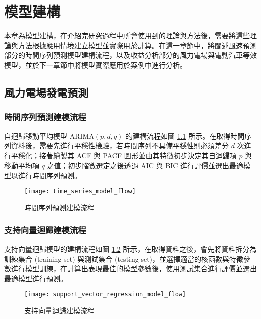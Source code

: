 
\chapter{模型建構}

本章為模型建構，在介紹完研究過程中所會使用到的理論與方法後，需要將這些理論與方法根據應用情境建立模型並實際用於計算。在這一章節中，將闡述風速預測部分的時間序列預測模型建構流程，以及收益分析部分的風力電場與電動汽車等效模型，並於下一章節中將模型實際應用於案例中進行分析。

\section{風力電場發電預測}

\subsection{時間序列預測建模流程}

自迴歸移動平均模型 $\text{ARIMA}(p, d, q)$ 的建構流程如圖 \ref{figure: Time Series Model Flow} 所示。在取得時間序列資料後，需要先進行平穩性檢驗，若時間序列不具備平穩性則必須差分 $d$ 次進行平穩化；接著繪製其 ACF 與 PACF 圖形並由其特徵初步決定其自迴歸項 $p$ 與移動平均項 $q$ 之值；初步階數選定之後透過 AIC 與 BIC 進行評價並選出最適模型以進行時間序列預測。

\begin{figure}[htbp]
  \centering
  \texttt{[image: time\_series\_model\_flow]}
  \caption{時間序列預測建模流程}
  \label{figure: Time Series Model Flow}
\end{figure}

\subsection{支持向量迴歸建模流程}

支持向量迴歸模型的建構流程如圖 \ref{figure: Support Vector Regression Flow} 所示，在取得資料之後，會先將資料拆分為訓練集合 (training set) 與測試集合 (testing set)，並選擇適當的核函數與特徵參數進行模型訓練，在計算出表現最佳的模型參數後，使用測試集合進行評價並選出最適模型進行預測。

\begin{figure}[htbp]
  \centering
\texttt{[image: support\_vector\_regression\_model\_flow]}
  \caption{支持向量迴歸建模流程}
  \label{figure: Support Vector Regression Flow}
\end{figure}

